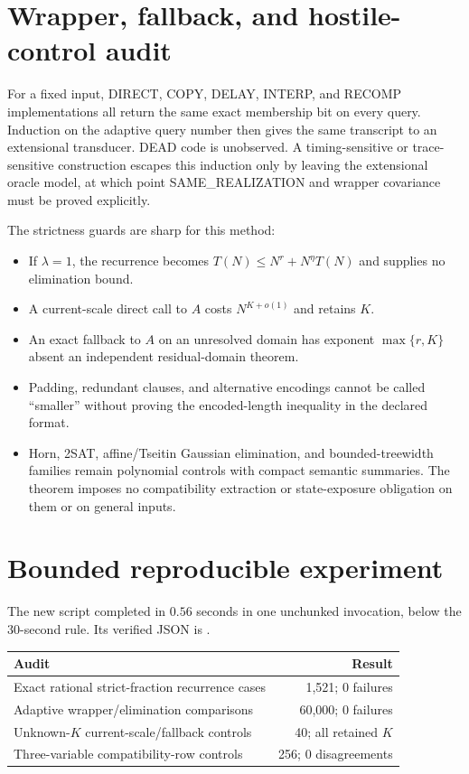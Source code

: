 \documentclass[11pt]{article}
\begin{document}
\section{Wrapper, fallback, and hostile-control audit}

For a fixed input, DIRECT, COPY, DELAY, INTERP, and RECOMP implementations all
return the same exact membership bit on every query.  Induction on the adaptive
query number then gives the same transcript to an extensional transducer.
DEAD code is unobserved.  A timing-sensitive or trace-sensitive construction
escapes this induction only by leaving the extensional oracle model, at which
point SAME\_REALIZATION and wrapper covariance must be proved explicitly.

The strictness guards are sharp for this method:
\begin{itemize}
\item If $\lambda=1$, the recurrence becomes
$T(N)\le N^r+N^\eta T(N)$ and supplies no elimination bound.
\item A current-scale direct call to $A$ costs $N^{K+o(1)}$ and retains $K$.
\item An exact fallback to $A$ on an unresolved domain has exponent
$\max\{r,K\}$ absent an independent residual-domain theorem.
\item Padding, redundant clauses, and alternative encodings cannot be called
``smaller'' without proving the encoded-length inequality in the declared
format.
\item Horn, 2SAT, affine/Tseitin Gaussian elimination, and bounded-treewidth
families remain polynomial controls with compact semantic summaries.  The
theorem imposes no compatibility extraction or state-exposure obligation on
them or on general inputs.
\end{itemize}

\section{Bounded reproducible experiment}

The new script
completed in $0.56$ seconds in one unchunked invocation, below the 30-second
rule.  Its verified JSON is
.

\begin{center}
\begin{tabular}{@{}lr@{}}
\toprule
Audit & Result\\
\midrule
Exact rational strict-fraction recurrence cases & 1,521; 0 failures\\
Adaptive wrapper/elimination comparisons & 60,000; 0 failures\\
Unknown-$K$ current-scale/fallback controls & 40; all retained $K$\\
Three-variable compatibility-row controls & 256; 0 disagreements\\
\bottomrule
\end{tabular}
\end{center}
\end{document}
